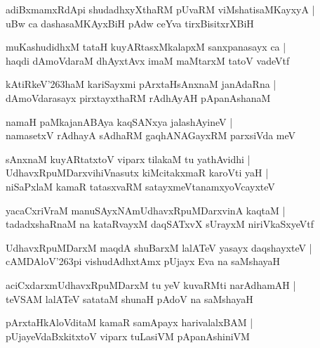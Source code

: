 \begin{shloka}
adiBxmamxRdApi shudadhxyXthaRM pUvaRM viMshatisaMKayxyA |\\
uBw ca dashasaMKAyxBiH pAdw ceYva tirxBisitxrXBiH
\end{shloka}

\begin{shloka}
muKashudidhxM tataH kuyARtasxMkalapxM sanxpanasayx ca |\\
haqdi dAmoVdaraM dhAyxtAvx imaM maMtarxM tatoV vadeVtf
\end{shloka}

\begin{shloka}
kAtiRkeV\char'263haM kariSayxmi pArxtaHsAnxnaM janAdaRna |\\
dAmoVdarasayx pirxtayxthaRM rAdhAyAH pApanAshanaM
\end{shloka}

\begin{shloka}
namaH paMkajanABAya kaqSANxya jalashAyineV |\\
namasetxV rAdhayA sAdhaRM gaqhANAGayxRM parxsiVda meV 
\end{shloka}

\begin{shloka}
sAnxnaM kuyARtatxtoV viparx tilakaM tu yathAvidhi |\\
UdhavxRpuMDarxvihiVnasutx kiMcitakxmaR karoVti yaH |\\
niSaPxlaM kamaR tatasxvaRM satayxmeVtanamxyoVcayxteV 
\end{shloka}

\begin{shloka}
yacaCxriVraM manuSAyxNAmUdhavxRpuMDarxvinA kaqtaM |\\
tadadxshaRnaM na kataRvayxM daqSATxvX sUrayxM niriVkaSxyeVtf 
\end{shloka}

\begin{shloka}
UdhavxRpuMDarxM maqdA shuBarxM lalATeV yasayx daqshayxteV |\\
cAMDAloV\char'263pi vishudAdhxtAmx pUjayx Eva na saMshayaH 
\end{shloka}

\begin{shloka}
aciCxdarxmUdhavxRpuMDarxM tu yeV kuvaRMti narAdhamAH |\\
teVSAM lalATeV satataM shunaH pAdoV na saMshayaH 
\end{shloka}

\begin{shloka}
pArxtaHkAloVditaM kamaR samApayx harivalalxBAM |\\
pUjayeVdaBxkitxtoV viparx tuLasiVM pApanAshiniVM
\end{shloka}

